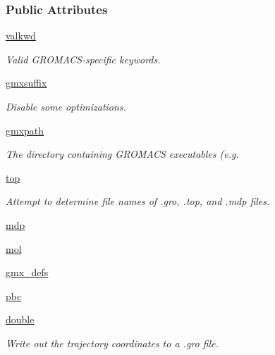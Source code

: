 \subsubsection*{Public Attributes}
\begin{DoxyCompactItemize}
\item 
\hyperlink{classforcebalance_1_1gmxio_1_1GMX_a8f70871633074667e271e865f2f54b41}{valkwd}
\begin{DoxyCompactList}\small\item\em Valid G\-R\-O\-M\-A\-C\-S-\/specific keywords. \end{DoxyCompactList}\item 
\hyperlink{classforcebalance_1_1gmxio_1_1GMX_ad3255c98ff1cdd0f3ae115857d899ce5}{gmxsuffix}
\begin{DoxyCompactList}\small\item\em Disable some optimizations. \end{DoxyCompactList}\item 
\hyperlink{classforcebalance_1_1gmxio_1_1GMX_ab2081cd93ac2c3a80e205884e0f12710}{gmxpath}
\begin{DoxyCompactList}\small\item\em The directory containing G\-R\-O\-M\-A\-C\-S executables (e.\-g. \end{DoxyCompactList}\item 
\hyperlink{classforcebalance_1_1gmxio_1_1GMX_acdd7f2bbbdbb41c9abcfafb1c22751fe}{top}
\begin{DoxyCompactList}\small\item\em Attempt to determine file names of .gro, .top, and .mdp files. \end{DoxyCompactList}\item 
\hyperlink{classforcebalance_1_1gmxio_1_1GMX_a6476e88d7e7aefec1fe2d07e30be2eb2}{mdp}
\item 
\hyperlink{classforcebalance_1_1gmxio_1_1GMX_a7accb28dad3f9986cc8b622125feed5d}{mol}
\item 
\hyperlink{classforcebalance_1_1gmxio_1_1GMX_a506f2156321a4f0901731203a176f41a}{gmx\-\_\-defs}
\item 
\hyperlink{classforcebalance_1_1gmxio_1_1GMX_abc67927b9df0c1406c307c9ab3c1311b}{pbc}
\item 
\hyperlink{classforcebalance_1_1gmxio_1_1GMX_a13a59a8ae726e3a53d8e47ee69109fa5}{double}
\begin{DoxyCompactList}\small\item\em Write out the trajectory coordinates to a .gro file. \end{DoxyCompactList}\item 

\end{DoxyCompactItemize}
